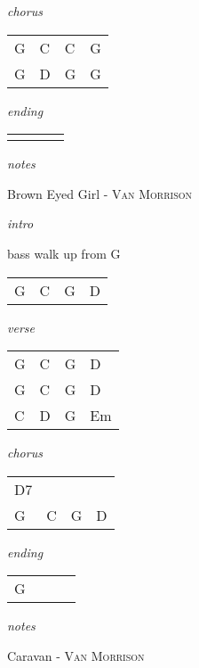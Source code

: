 \documentclass[12pt]{article}
\begin{document}
\textit{chorus}

\begin{tabular}{|P{1.25in}|P{1.25in}|P{1.25in}|P{1.25in}|}
  G  &  C & C  & G  \\
  G  &  D & G  & G  \\
\end{tabular}


\textit{ending}

\begin{tabular}{|P{1.25in}|P{1.25in}|P{1.25in}|P{1.25in}|}
    &   &   &   \\
\end{tabular}

\textit{notes}

\newpage


{\Huge Brown Eyed Girl} {\huge - \textsc{Van Morrison}}

\huge
\textit{intro}

bass walk up from G

\begin{tabular}{|P{1.25in}|P{1.25in}|P{1.25in}|P{1.25in}|}
  G &  C  &  G  &  D \\
\end{tabular}

\textit{verse}

\begin{tabular}{|P{1.25in}|P{1.25in}|P{1.25in}|P{1.25in}|}
  G &  C  &  G  &  D \\
  G &  C  &  G  &  D \\
  C &  D  &  G  &  Em \\
\end{tabular}

\textit{chorus}

\begin{tabular}{|P{1.25in}|P{1.25in}|P{1.25in}|P{1.25in}|}
  D7 &     &     &   \\
  G  &  C  &  G  &  D \\
\end{tabular}

\textit{ending}

\begin{tabular}{|P{1.25in}|P{1.25in}|P{1.25in}|P{1.25in}|}
  G  &   &   &   \\
\end{tabular}

\textit{notes}

\newpage

{\Huge Caravan} {\huge - \textsc{Van Morrison}}
\end{document}
